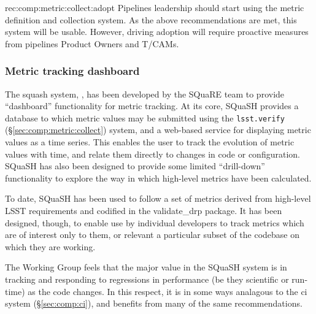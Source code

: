 \begin{recommendation}
    {rec:comp:metric:collect:adopt}
    {Pipelines leadership should start using the metric definition and collection system.}
    As the above recommendations are met, this system will be usable.
    However, driving adoption will require proactive measures from pipelines Product Owners and T/CAMs.
\end{recommendation}

\subsubsection{Metric tracking dashboard}
\label{sec:comp:metric:dashboard}

The \gls{squash} system, , has been developed by the SQuaRE team to provide ``\gls{dashboard}'' functionality for metric tracking.
At its core, SQuaSH provides a database to which metric values may be submitted using the \texttt{lsst.verify} (\S\ref{sec:comp:metric:collect}) system, and a web-based service for displaying metric values as a time series.
This enables the user to track the evolution of metric values with time, and relate them directly to changes in code or configuration.
SQuaSH has also been designed to provide some limited ``drill-down'' functionality to explore the way in which high-level metrics have been calculated.

To date, SQuaSH has been used to follow a set of metrics derived from high-level LSST requirements and codified in the validate\_drp package.
It has been designed, though, to enable use by individual developers to track metrics which are of interest only to them, or relevant a particular subset of the codebase on which they are working.

The Working Group feels that the major value in the SQuaSH system is in tracking and responding to regressions in performance (be they scientific or run-time) as the code changes.
In this respect, it is in some ways analagous to the \gls{ci} system (\S\ref{sec:comp:ci}), and benefits from many of the same recommendations.

